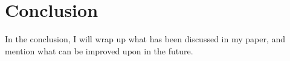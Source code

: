 



\chapter{Conclusion} \label{c:conclusion}

In the conclusion, I will wrap up what has been discussed in my
paper, and mention what can be improved upon in the future. 
